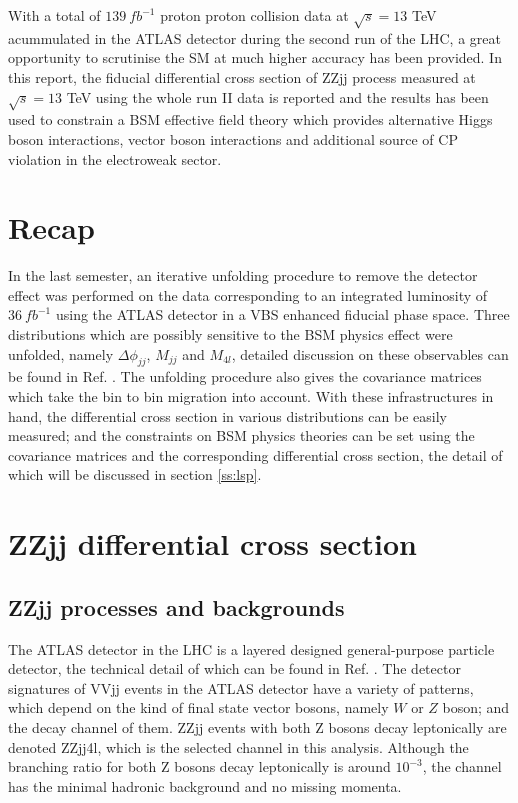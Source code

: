 \documentclass[a4paper,12pt]{article}
\begin{document}
		\par With a total of $139\ fb^{-1}$ proton proton collision data at 
		$\sqrt{s} = 13$ TeV acummulated in the ATLAS detector\cite{Aad:2008zzm} 
		during the second run of the LHC, a great opportunity to scrutinise the SM at 
		much higher accuracy has been provided. In this report, the fiducial differential cross section 
		of ZZjj process measured at $\sqrt{s} = 13$ TeV using the whole run II data is reported and 
		the results has been used to constrain a BSM effective field theory\cite{Brivio_2017} which provides 
		alternative Higgs boson interactions, vector boson interactions and additional source of CP violation 
		in the electroweak sector.

	\section{Recap} \label{sec:recap}
		\par In the last semester\cite{last:2020}, an iterative unfolding procedure to remove the detector effect\cite{DAgostini:1994fjx} 
		was performed on the data corresponding to an integrated luminosity of $36\ fb^{-1}$ using the 
		ATLAS detector in a VBS enhanced fiducial phase space. Three distributions which are possibly sensitive to the 
		BSM physics effect were unfolded, namely $\Delta\phi_{jj}$, $M_{jj}$ and $M_{4l}$, detailed discussion on
		these observables can be found in Ref. \cite{last:2020}. The unfolding procedure also gives the covariance
		matrices which take the bin to bin migration into account. With these infrastructures  in hand, the differential 
		cross section in various distributions can be easily measured; and the constraints on BSM physics theories can be set using the covariance matrices
		and the corresponding differential cross section, the detail of which will be discussed in section \ref{ss:lsp}.
	\section{ZZjj differential cross section} \label{sec:xsmea}
		\subsection{ZZjj processes and backgrounds}
			\par The ATLAS detector in the LHC is a layered designed general-purpose particle detector, the technical detail of which 
			can be found in Ref. \cite{Aad:2008zzm}. The detector signatures of VVjj events in the ATLAS detector have a variety of 
			patterns, which depend on the kind of final state vector bosons, namely $W$ or $Z$ boson; and the decay channel 
			of them\cite{Watkins:1986va}. ZZjj events with both Z bosons decay leptonically are denoted ZZjj4l, which is the selected
			channel in this analysis. Although the branching ratio for both Z bosons decay leptonically is around $10^{-3}$\cite{PhysRevD.98.030001},
			the channel has the minimal hadronic background and no missing momenta.
\end{document}
